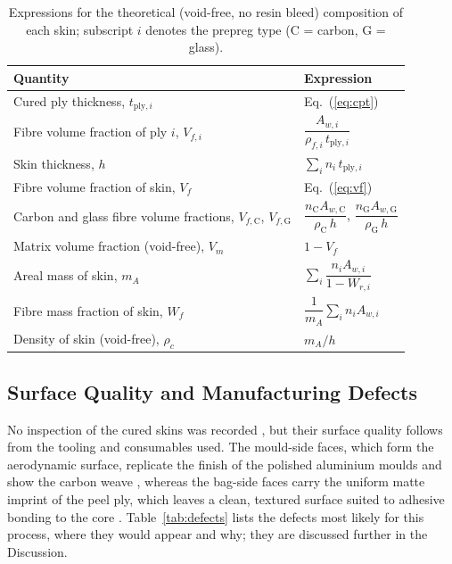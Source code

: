 \begin{table}[htbp]
    \addedfloat
    \centering
    \caption{Expressions for the theoretical (void-free, no resin bleed)
    composition of each skin; subscript $i$ denotes the prepreg type
    (C = carbon, G = glass).}
    \label{tab:vf}
    \small
    \renewcommand{\arraystretch}{1.7}
    \begin{tabular}{@{}ll@{}}
        \toprule
        \textbf{Quantity} & \textbf{Expression} \\
        \midrule
        Cured ply thickness, $t_{\mathrm{ply},i}$ & Eq.~(\ref{eq:cpt}) \\
        Fibre volume fraction of ply $i$, $V_{f,i}$ & $\dfrac{A_{w,i}}{\rho_{f,i}\,t_{\mathrm{ply},i}}$ \\
        Skin thickness, $h$ & $\sum_i n_i\,t_{\mathrm{ply},i}$ \\
        Fibre volume fraction of skin, $V_f$ & Eq.~(\ref{eq:vf}) \\
        Carbon and glass fibre volume fractions, $V_{f,\mathrm{C}}$, $V_{f,\mathrm{G}}$
            & $\dfrac{n_\mathrm{C}A_{w,\mathrm{C}}}{\rho_\mathrm{C}\,h}$,\quad
              $\dfrac{n_\mathrm{G}A_{w,\mathrm{G}}}{\rho_\mathrm{G}\,h}$ \\
        Matrix volume fraction (void-free), $V_m$ & $1 - V_f$ \\
        Areal mass of skin, $m_A$ & $\sum_i \dfrac{n_i A_{w,i}}{1-W_{r,i}}$ \\
        Fibre mass fraction of skin, $W_f$ & $\dfrac{1}{m_A}\sum_i n_i A_{w,i}$ \\
        Density of skin (void-free), $\rho_c$ & $m_A / h$ \\
        \bottomrule
    \end{tabular}
\end{table}

\begin{addedblock}
\subsection{Surface Quality and Manufacturing Defects}

No inspection of the cured skins was recorded , but their surface
quality follows from the tooling and consumables used. The mould-side
faces, which form the aerodynamic surface, replicate the finish of the
polished aluminium moulds and show the carbon weave
\citep{campbell2004,explorecomposites_tooling}, whereas the bag-side
faces carry the uniform matte imprint of the peel ply, which leaves a
clean, textured surface suited to adhesive bonding to the core
\citep{kanerva2013}. Table~\ref{tab:defects} lists the defects most
likely for this process, where they would appear and why; they are
discussed further in the Discussion.
\end{addedblock}

